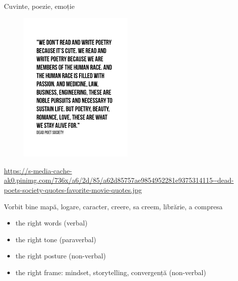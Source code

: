 \documentclass{simple}
\begin{document}
\begin{frame}{Cuvinte, poezie, emoție}
  \begin{figure}
    \centering
    \includegraphics[width=0.5\textwidth]{img/dead-poets-society-words-alive}
  \end{figure}
  \begin{center}
    \tiny
    \url{https://s-media-cache-ak0.pinimg.com/736x/a6/2d/85/a62d85757ae9854952281e9375314115--dead-poets-society-quotes-favorite-movie-quotes.jpg}
  \end{center}
\end{frame}

\begin{frame}{Vorbit bine}
  \pause
  mapă, logare, caracter, creere, sa creem, librărie, a compresa\\
  \vspace{5mm}
  \begin{itemize}
    \pause
    \item the right words (verbal)
    \pause
    \item the right tone (paraverbal)
    \pause
    \item the right posture (non-verbal)
    \pause
    \item the right frame: mindset, storytelling, convergență (non-verbal)
  \end{itemize}
\end{frame}
\end{document}
